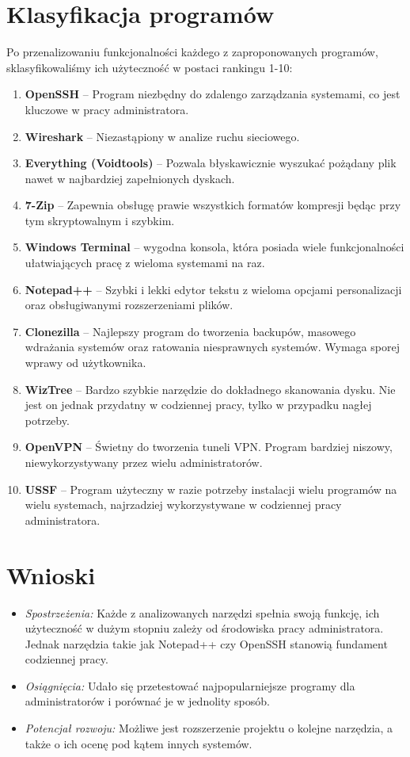 \documentclass[0.82pt,a4paper]{article}
\begin{document}
\newpage
\section{Klasyfikacja programów}
    Po przenalizowaniu funkcjonalności każdego z zaproponowanych programów, sklasyfikowaliśmy ich użyteczność w postaci rankingu 1-10:
    \begin{enumerate}
        \item \textbf{OpenSSH} -- Program niezbędny do zdalengo zarządzania systemami, co jest kluczowe w pracy administratora.
        \item \textbf{Wireshark} -- Niezastąpiony w analize ruchu sieciowego.
        \item \textbf{Everything (Voidtools)} -- Pozwala błyskawicznie wyszukać pożądany plik nawet w najbardziej zapełnionych dyskach.
        \item \textbf{7-Zip} -- Zapewnia obsługę prawie wszystkich formatów kompresji będąc przy tym skryptowalnym i szybkim.
        \item \textbf{Windows Terminal} -- wygodna konsola, która posiada wiele funkcjonalności ułatwiających pracę z wieloma systemami na raz.
        \item \textbf{Notepad++} -- Szybki i lekki edytor tekstu z wieloma opcjami personalizacji oraz obsługiwanymi rozszerzeniami plików.
        \item \textbf{Clonezilla} -- Najlepszy program do tworzenia backupów, masowego wdrażania systemów oraz ratowania niesprawnych systemów. Wymaga sporej wprawy od użytkownika.
        \item \textbf{WizTree} -- Bardzo szybkie narzędzie do dokładnego skanowania dysku. Nie jest on jednak przydatny w codziennej pracy, tylko w przypadku nagłej potrzeby.
        \item \textbf{OpenVPN} -- Świetny do tworzenia tuneli VPN. Program bardziej niszowy, niewykorzystywany przez wielu administratorów.
        \item \textbf{USSF} -- Program użyteczny w razie potrzeby instalacji wielu programów na wielu systemach, najrzadziej wykorzystywane w codziennej pracy administratora.
    \end{enumerate}
\section{Wnioski}
	\begin{itemize}
		\item \textit{Spostrzeżenia:} Każde z analizowanych narzędzi spełnia swoją funkcję, ich użyteczność w dużym stopniu zależy od środowiska pracy administratora. Jednak narzędzia takie jak Notepad++ czy OpenSSH stanowią fundament codziennej pracy.
		\item \textit{Osiągnięcia:} Udało się przetestować najpopularniejsze programy dla administratorów i porównać je w jednolity sposób.
		\item \textit{Potencjał rozwoju:} Możliwe jest rozszerzenie projektu o kolejne narzędzia, a także o ich ocenę pod kątem innych systemów.
	\end{itemize}
\end{document}
